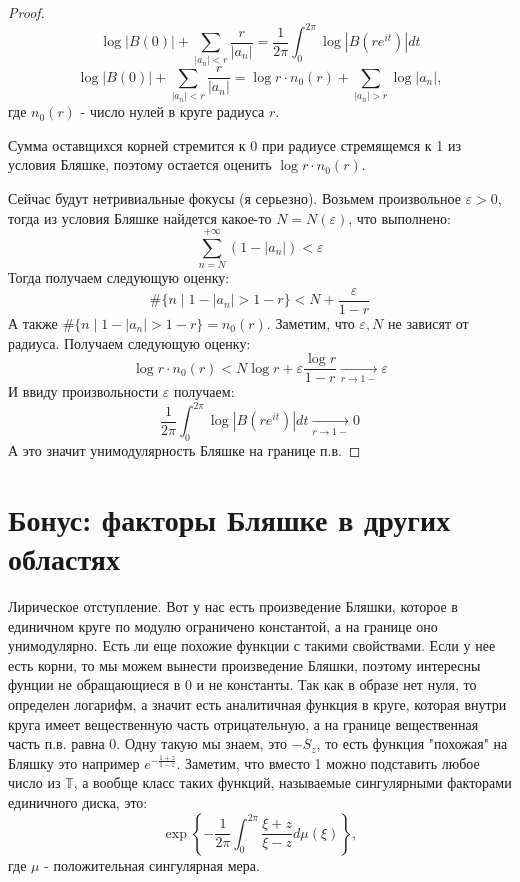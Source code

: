 \documentclass[12pt,a4paper]{article} %
\newtheorem{theorem}{Теорема}
\begin{document}
	\begin{proof}
		$$\log|B(0)|+\sum\limits_{|a_n|<r}\frac{r}{|a_n|}=\frac{1}{2\pi}\int_0^{2\pi}\log|B(re^{it})|dt$$
		$$\log|B(0)|+\sum\limits_{|a_n|<r}\frac{r}{|a_n|}=\log r\cdot n_0(r)+\sum\limits_{|a_n|>r}\log|a_n|,$$
		где $n_0(r)$ - число нулей в круге радиуса $r$.
		
		Сумма оставщихся корней стремится к 0 при радиусе стремящемся к 1 из условия Бляшке, поэтому остается оценить $\log r\cdot n_0(r)$.
		
		Сейчас будут нетривиальные фокусы (я серьезно). Возьмем произвольное $\varepsilon>0$, тогда из условия Бляшке найдется какое-то $N=N(\varepsilon)$, что выполнено:
		$$\sum_{n=N}^{+\infty}(1-|a_n|)<\varepsilon$$
		Тогда получаем следующую оценку:
		$$\#\{n\mid 1-|a_n|>1-r\}<N+\frac{\varepsilon}{1-r}$$
		А также $\#\{n\mid 1-|a_n|>1-r\}=n_0(r)$. Заметим, что $\varepsilon, N$ не зависят от радиуса. Получаем следующую оценку:
		$$\log r\cdot n_0(r)<N\log r+\varepsilon\frac{\log r}{1-r}\xrightarrow[r\rightarrow1-]{}\varepsilon$$
		И ввиду произвольности $\varepsilon$ получаем:
		$$\frac{1}{2\pi}\int_0^{2\pi}\log|B(re^{it})|dt\xrightarrow[r\rightarrow1-]{}0$$
		А это значит унимодулярность Бляшке на границе п.в.
	\end{proof}
	\section{Бонус: факторы Бляшке в других областях}
	Лирическое отступление. Вот у нас есть произведение Бляшки, которое в единичном круге по модулю ограничено константой, а на границе оно унимодулярно. Есть ли еще похожие функции с такими свойствами. Если у нее есть корни, то мы можем вынести произведение Бляшки, поэтому интересны фунции не обращающиеся в 0 и не константы. Так как в образе нет нуля, то определен логарифм, а значит есть аналитичная функция в круге, которая внутри круга имеет вещественную часть отрицательную, а на границе вещественная часть п.в. равна 0. Одну такую мы знаем, это $-S_z$, то есть функция "похожая" на Бляшку это например $e^{-\frac{1+z}{1-z}}$. Заметим, что вместо 1 можно подставить любое число из $\mathbb{T}$, а вообще класс таких функций, называемые сингулярными факторами единичного диска, это:
	$$\exp\left\{-\frac{1}{2\pi}\int_0^{2\pi}\frac{\xi+z}{\xi-z}d\mu(\xi)\right\},$$
	где $\mu$ - положительная сингулярная мера.
	
\end{document}
